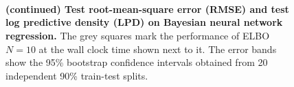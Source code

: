 \begin{figure}[H]
  \centering
  \vspace{0.05in}\\
  \vspace{0.05in}\\
  \vspace{0.05in}\\
  \caption{\textbf{(continued) Test root-mean-square error (RMSE) and test log predictive density (LPD) on Bayesian neural network regression.}
    The grey squares mark the performance of ELBO \(N=10\) at the wall clock time shown next to it.
  The error bands show the 95\% bootstrap confidence intervals obtained from 20 independent 90\% train-test splits.}
\end{figure}

